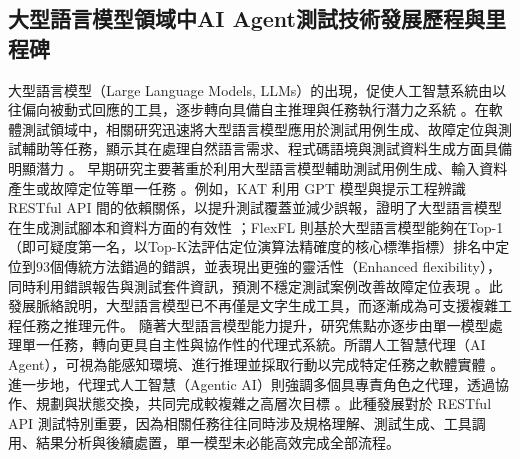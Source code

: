 \begin{ZhChapter}
\section{大型語言模型領域中AI Agent測試技術發展歷程與里程碑}
\text 大型語言模型（Large Language Models, LLMs）的出現，促使人工智慧系統由以往偏向被動式回應的工具，逐步轉向具備自主推理與任務執行潛力之系統 \parencite{Hosseini2025Role, Bandi2025Rise}。在軟體測試領域中，相關研究迅速將大型語言模型應用於測試用例生成、故障定位與測試輔助等任務，顯示其在處理自然語言需求、程式碼語境與測試資料生成方面具備明顯潛力 \parencite{Fatima2023Flakify, Xu2025FlexFL, Anonymous2023LLMGenerators, Wang2024Software, Anonymous2025GenAIRoles}。
\text 早期研究主要著重於利用大型語言模型輔助測試用例生成、輸入資料產生或故障定位等單一任務 \parencite{Anonymous2023LLMGenerators, Wang2024Software}。例如，KAT 利用 GPT 模型與提示工程辨識 RESTful API 間的依賴關係，以提升測試覆蓋並減少誤報，證明了大型語言模型在生成測試腳本和資料方面的有效性 \parencite{Nguyen2024KAT}；FlexFL 則基於大型語言模型能夠在Top-1（即可疑度第一名，以Top-K法評估定位演算法精確度的核心標準指標）排名中定位到93個傳統方法錯過的錯誤，並表現出更強的靈活性（Enhanced flexibility），同時利用錯誤報告與測試套件資訊，預測不穩定測試案例改善故障定位表現 \parencite{Xu2025FlexFL, Fatima2023Flakify}。此發展脈絡說明，大型語言模型已不再僅是文字生成工具，而逐漸成為可支援複雜工程任務之推理元件。
\text 隨著大型語言模型能力提升，研究焦點亦逐步由單一模型處理單一任務，轉向更具自主性與協作性的代理式系統。所謂人工智慧代理（AI Agent），可視為能感知環境、進行推理並採取行動以完成特定任務之軟體實體 \parencite{Bandi2025Rise}。進一步地，代理式人工智慧（Agentic AI）則強調多個具專責角色之代理，透過協作、規劃與狀態交換，共同完成較複雜之高層次目標 \parencite{Bandi2025Rise, Borghoff2025Beyond}。此種發展對於 RESTful API 測試特別重要，因為相關任務往往同時涉及規格理解、測試生成、工具調用、結果分析與後續處置，單一模型未必能高效完成全部流程。


\end{ZhChapter}
